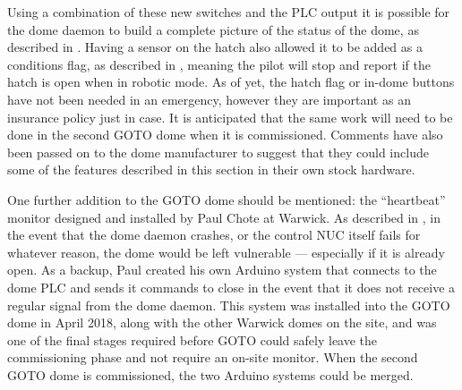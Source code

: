 \begin{colsection}
\begin{colsection}
Using a combination of these new switches and the PLC output it is possible for the dome daemon to build a complete picture of the status of the dome, as described in . Having a sensor on the hatch also allowed it to be added as a conditions flag, as described in , meaning the pilot will stop and report if the hatch is open when in robotic mode. As of yet, the hatch flag or in-dome buttons have not been needed in an emergency, however they are important as an insurance policy just in case. It is anticipated that the same work will need to be done in the second GOTO dome when it is commissioned. Comments have also been passed on to the dome manufacturer to suggest that they could include some of the features described in this section in their own stock hardware.

One further addition to the GOTO dome should be mentioned: the ``heartbeat'' monitor designed and installed by Paul Chote at Warwick. As described in , in the event that the dome daemon crashes, or the control NUC itself fails for whatever reason, the dome would be left vulnerable --- especially if it is already open. As a backup, Paul created his own Arduino system that connects to the dome PLC and sends it commands to close in the event that it does not receive a regular signal from the dome daemon. This system was installed into the GOTO dome in April 2018, along with the other Warwick domes on the site, and was one of the final stages required before GOTO could safely leave the commissioning phase and not require an on-site monitor. When the second GOTO dome is commissioned, the two Arduino systems could be merged.

\end{colsection}


\end{colsection}


\newpage
